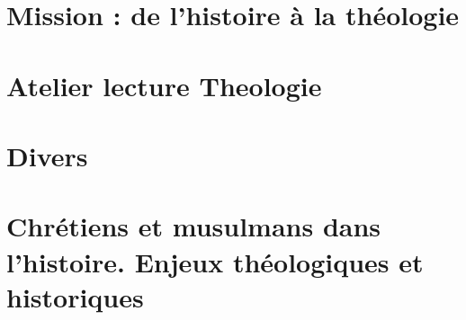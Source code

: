 \documentclass[oneside,10pt]{book}
\begin{document}
  \part{Mission : de l'histoire à la théologie}
 
 
  
 
 
 
  
  
  
 
 


% 
 
 
 
  \part{Atelier lecture Theologie}
 
 
 
  
  
    
  
 

 
 
 
 \part{Divers}





 \part{Chrétiens et musulmans dans l'histoire. Enjeux théologiques et historiques}




\end{document}
